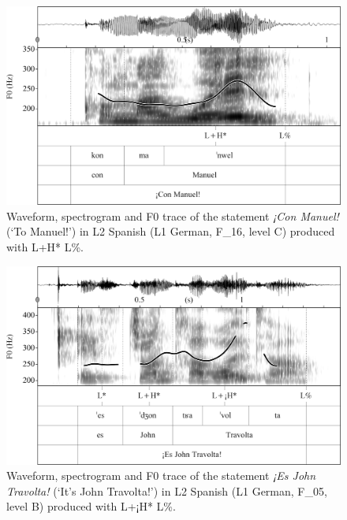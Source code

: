 \begin{figure}

\includegraphics[width=\textwidth]{figures/Figure_4.37.png}


\caption{Waveform, spectrogram and F0 trace of the statement \textit{¡Con Manuel!} (‘To Manuel!’) in L2 Spanish (L1 German, F\_16, level C) produced with L+H* L\%.}
\label{fig:4.37}
\end{figure}

\begin{figure}


\includegraphics[width=\textwidth]{figures/Figure_4.38.png}


\caption{Waveform, spectrogram and F0 trace of the statement \textit{¡Es John Travolta!} (‘It’s John Travolta!’) in L2 Spanish (L1 German, F\_05, level B) produced with L+¡H* L\%.}
\label{fig:4.38}
\end{figure}

